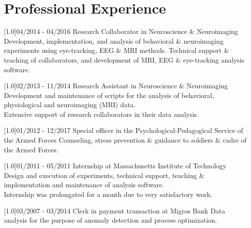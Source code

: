 \documentclass[english]{cv-style}
\begin{document}
\section{Professional Experience}
\begin{entrylist}
\entry
  {\scalebox{.8}[1.0]{04/2014 - 04/2016}}
  {Research Collaborator in Neuroscience \& Neuroimaging}
  {}
  {Development, implementation, and analysis of behavioral \& neuroimaging experiments using eye-tracking, EEG \& MRI methods. Technical support \& teaching of collaborators, and development of MRI, EEG \& eye-tracking analysis software.\\}
\end{entrylist}
\begin{entrylist}
\entry
  {\scalebox{.8}[1.0]{02/2013 - 11/2014}}
  {Research Assistant in Neuroscience \& Neuroimaging}
  {}
  {Development and maintenance of scripts for the analysis of behavioral, physiological and neuroimaging (MRI) data.\\Extensive support of research collaborators in their data analysis.\\}
\end{entrylist}
\begin{entrylist}
\entry
  {\scalebox{.8}[1.0]{01/2012 - 12/2017}}
  {Special officer in the Psychological-Pedagogical Service of the Armed Forces}
  {}
  {Counseling, stress prevention \& guidance to soldiers \& cadre of the Armed Forces.\\}
\end{entrylist}
\begin{entrylist}
\entry
  {\scalebox{.8}[1.0]{01/2011 - 05/2011}}
  {Internship at Massachusetts Institute of Technology}
  {}
  {Design and execution of experiments, technical support, teaching \& implementation and maintenance of analysis software.\\Internship was prolongated for a month due to very satisfactory work.\\}
\end{entrylist}
\begin{entrylist}
\entry
  {\scalebox{.8}[1.0]{03/2007 - 03/2014}}
  {Clerk in payment transaction at Migros Bank}
  {}
  {Data analysis for the purpose of anomaly detection and process optimization.\\}
\end{entrylist}
\end{document}
